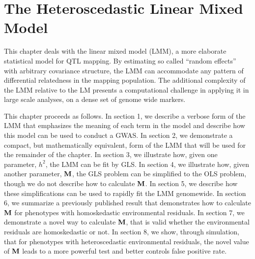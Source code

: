 \chapter{The Heteroscedastic Linear Mixed Model}
\label{chap:het_LMM}


This chapter deals with the linear mixed model (LMM), a more elaborate statistical model for QTL mapping.
By estimating so called ``random effects'' with arbitrary covariance structure, the LMM can accommodate any pattern of differential relatedness in the mapping population.
The additional complexity of the LMM relative to the LM presents a computational challenge in applying it in large scale analyses, \eg on a dense set of genome wide markers.

This chapter proceeds as follows.
In section 1, we describe a verbose form of the LMM that emphasizes the meaning of each term in the model and describe how this model can be used to conduct a GWAS.
In section 2, we demonstrate a compact, but mathematically equivalent, form of the LMM that will be used for the remainder of the chapter.
In section 3, we illustrate how, given one parameter, $h^2$, the LMM can be fit by GLS.
In section 4, we illustrate how, given another parameter, $\mathbf{M}$, the GLS problem can be simplified to the OLS problem, though we do not describe how to calculate $\mathbf{M}$.
In section 5, we describe how these simplifications can be used to rapidly fit the LMM genomewide.
In section 6, we summarize a previously published result that demonstrates how to calculate $\mathbf{M}$ for phenotypes with homoskedastic environmental residuals.
In section 7, we demonstrate a novel way to calculate $\mathbf{M}$, that is valid whether the environmental residuals are homoskedastic or not.
In section 8, we show, through simulation, that for phenotypes with heteroscedastic environmental residuals, the novel value of $\mathbf{M}$ leads to a more powerful test and better controls false positive rate.



